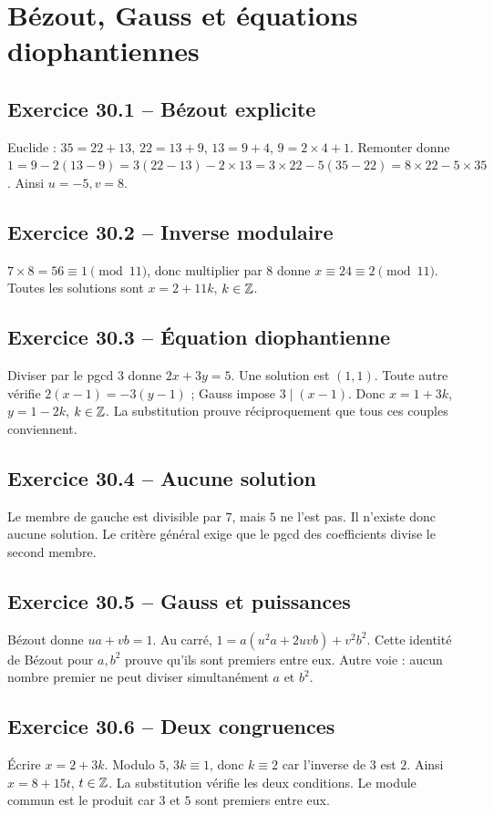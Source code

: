 \chapter{Bézout, Gauss et équations diophantiennes}
\section*{Exercice 30.1 -- Bézout explicite}
Euclide : $35=22+13$, $22=13+9$, $13=9+4$, $9=2\times4+1$. Remonter donne $1=9-2(13-9)=3(22-13)-2\times13=3\times22-5(35-22)=8\times22-5\times35$. Ainsi $u=-5,v=8$.

\section*{Exercice 30.2 -- Inverse modulaire}
$7\times8=56\equiv1\pmod{11}$, donc multiplier par $8$ donne $x\equiv24\equiv2\pmod{11}$. Toutes les solutions sont $x=2+11k$, $k\in\mathbb{Z}$.

\section*{Exercice 30.3 -- Équation diophantienne}
Diviser par le pgcd $3$ donne $2x+3y=5$. Une solution est $(1,1)$. Toute autre vérifie $2(x-1)=-3(y-1)$ ; Gauss impose $3\mid(x-1)$. Donc $x=1+3k$, $y=1-2k$, $k\in\mathbb{Z}$. La substitution prouve réciproquement que tous ces couples conviennent.

\section*{Exercice 30.4 -- Aucune solution}
Le membre de gauche est divisible par $7$, mais $5$ ne l'est pas. Il n'existe donc aucune solution. Le critère général exige que le pgcd des coefficients divise le second membre.

\section*{Exercice 30.5 -- Gauss et puissances}
Bézout donne $ua+vb=1$. Au carré, $1=a(u^2a+2uvb)+v^2b^2$. Cette identité de Bézout pour $a,b^2$ prouve qu'ils sont premiers entre eux. Autre voie : aucun nombre premier ne peut diviser simultanément $a$ et $b^2$.

\section*{Exercice 30.6 -- Deux congruences}
Écrire $x=2+3k$. Modulo $5$, $3k\equiv1$, donc $k\equiv2$ car l'inverse de $3$ est $2$. Ainsi $x=8+15t$, $t\in\mathbb{Z}$. La substitution vérifie les deux conditions. Le module commun est le produit car $3$ et $5$ sont premiers entre eux.
